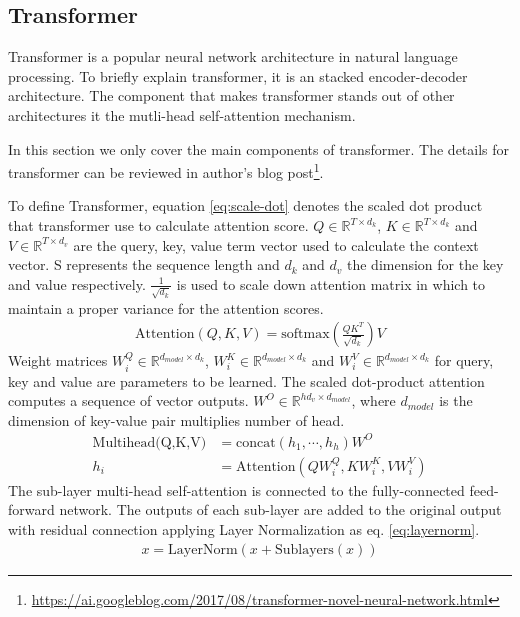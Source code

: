 \subsection{Transformer} \label{ch2:transformer}
Transformer\cite{vaswani_attention_2017} is a popular neural network architecture in natural language processing. To briefly explain transformer, it is an stacked encoder-decoder architecture. The component that makes transformer stands out of other architectures it the mutli-head self-attention mechanism. 

In this section we only cover the main components of transformer. The details for transformer can be reviewed in author's blog post\footnote{\url{https://ai.googleblog.com/2017/08/transformer-novel-neural-network.html}}.

To define Transformer, equation \ref{eq:scale-dot} denotes the scaled dot product that transformer use to calculate attention score. $ Q\in\mathbb{R}^{T\times d_k} $,  $ K\in\mathbb{R}^{T\times d_k} $ and $ V\in\mathbb{R}^{T\times d_v} $ are the query, key, value term vector used to calculate the context vector. S represents the sequence length and $ d_k $ and $ d_v $ the dimension for the key and value respectively. $ \frac{1}{\sqrt{d_k}} $ is used to scale down attention matrix in which to maintain a proper variance for the attention scores.
\begin{align}\label{eq:scale-dot}
\text{Attention}(Q,K,V) = \text{softmax}\left(\frac{QK^T}{\sqrt{d_k}}\right)V
\end{align}
Weight matrices $ W_i^Q\in\mathbb{R}^{d_{model}\times d_k} $, $ W_i^K\in\mathbb{R}^{d_{model}\times d_k} $ and $ W_	i^V\in\mathbb{R}^{d_{model}\times d_k} $  for query, key and value are parameters to be learned. The scaled dot-product attention computes a sequence of vector outputs. $ W^O\in\mathbb{R}^{hd_v\times d_{model}} $, where $ d_{model} $ is the dimension of key-value pair multiplies number of head.
\begin{align}
\text{Multihead(Q,K,V)}&=\text{concat}(h_1,\cdots,h_h)W^O\\
h_i&=\text{Attention}(QW_i^Q,KW_i^K,VW_i^V)
\end{align}
The sub-layer multi-head self-attention is connected to the fully-connected feed-forward network. The outputs of each sub-layer are added to the original output with residual connection applying Layer Normalization as eq. \ref{eq:layernorm}.
\begin{align}\label{eq:layernorm}
x=\text{LayerNorm}(x+\text{Sublayers}(x))
\end{align}
